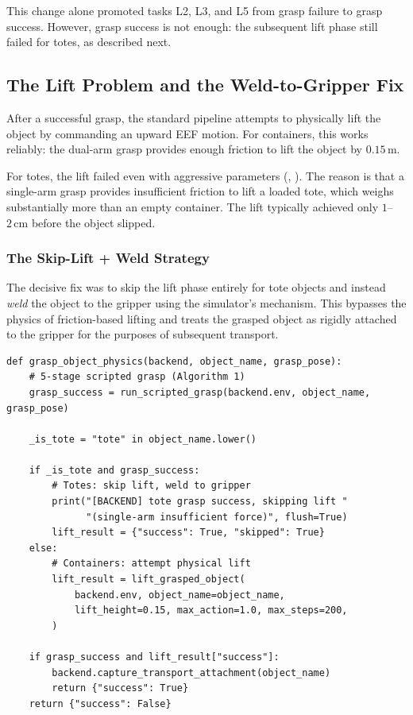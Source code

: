 This change alone promoted tasks L2, L3, and L5 from grasp failure to grasp success. However, grasp success is not enough: the subsequent lift phase still failed for totes, as described next.

\subsection{The Lift Problem and the Weld-to-Gripper Fix}
\label{sec:scripted_grasp:lift}

After a successful grasp, the standard pipeline attempts to physically lift the object by commanding an upward EEF motion. For containers, this works reliably: the dual-arm grasp provides enough friction to lift the object by $0.15\,\mathrm{m}$.

For totes, the lift failed even with aggressive parameters (, ). The reason is that a single-arm grasp provides insufficient friction to lift a loaded tote, which weighs substantially more than an empty container. The lift typically achieved only $1$--$2\,\mathrm{cm}$ before the object slipped.

\subsubsection{The Skip-Lift + Weld Strategy}
\label{sec:scripted_grasp:skip_lift}
\label{sec:scripted_grasp:strategy}

The decisive fix was to skip the lift phase entirely for tote objects and instead \emph{weld} the object to the gripper using the simulator's  mechanism. This bypasses the physics of friction-based lifting and treats the grasped object as rigidly attached to the gripper for the purposes of subsequent transport.

\begin{lstlisting}[caption={Object-type-aware lift logic (the decisive fix).}]
def grasp_object_physics(backend, object_name, grasp_pose):
    # 5-stage scripted grasp (Algorithm 1)
    grasp_success = run_scripted_grasp(backend.env, object_name, grasp_pose)

    _is_tote = "tote" in object_name.lower()

    if _is_tote and grasp_success:
        # Totes: skip lift, weld to gripper
        print("[BACKEND] tote grasp success, skipping lift "
              "(single-arm insufficient force)", flush=True)
        lift_result = {"success": True, "skipped": True}
    else:
        # Containers: attempt physical lift
        lift_result = lift_grasped_object(
            backend.env, object_name=object_name,
            lift_height=0.15, max_action=1.0, max_steps=200,
        )

    if grasp_success and lift_result["success"]:
        backend.capture_transport_attachment(object_name)
        return {"success": True}
    return {"success": False}
\end{lstlisting}

